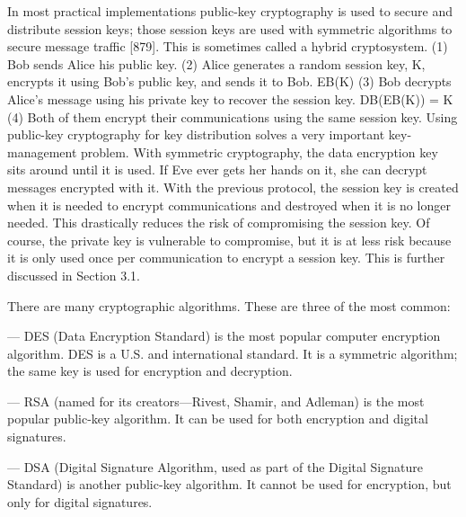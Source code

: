 In most practical implementations public-key cryptography is used to secure
and distribute session keys; those session keys are used with symmetric
algorithms to secure message traffic [879]. This is sometimes called a hybrid
cryptosystem.
(1) Bob sends Alice his public key.
(2) Alice generates a random session key, K, encrypts it using Bob’s
public key, and sends it to Bob.
EB(K)
(3) Bob decrypts Alice’s message using his private key to recover the
session key.
DB(EB(K)) = K
(4) Both of them encrypt their communications using the same session
key.
Using public-key cryptography for key distribution solves a very important
key-management problem. With symmetric cryptography, the data encryption
key sits around until it is used. If Eve ever gets her hands on it, she can decrypt
messages encrypted with it. With the previous protocol, the session key is
created when it is needed to encrypt communications and destroyed when it is
no longer needed. This drastically reduces the risk of compromising the
session key. Of course, the private key is vulnerable to compromise, but it is at
less risk because it is only used once per communication to encrypt a session
key. This is further discussed in Section 3.1.




































There are many cryptographic algorithms. These are three of the most common:

— DES (Data Encryption Standard) is the most popular computer encryption algorithm. DES is a U.S. and international standard. It is a
symmetric algorithm; the same key is used for encryption and decryption.

— RSA (named for its creators—Rivest, Shamir, and Adleman) is the most popular public-key algorithm. It can be used for both encryption
and digital signatures.

— DSA (Digital Signature Algorithm, used as part of the Digital Signature Standard) is another public-key algorithm. It cannot be used
for encryption, but only for digital signatures.





